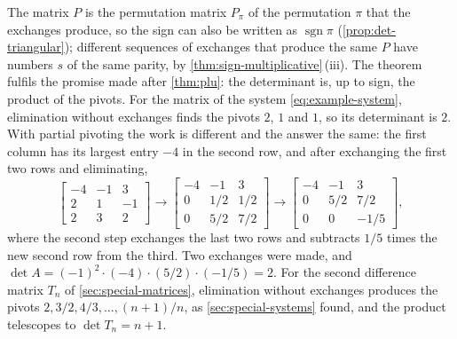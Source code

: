 The matrix $P$ is the permutation matrix $P_\pi$ of the permutation $\pi$ that the exchanges produce, so the sign can also be written as $\operatorname{sgn}\pi$ (\cref{prop:det-triangular}); different sequences of exchanges that produce the same $P$ have numbers $s$ of the same parity, by \cref{thm:sign-multiplicative}\,(iii). The theorem fulfils the promise made after \cref{thm:plu}: the determinant is, up to sign, the product of the pivots. For the matrix of the system \eqref{eq:example-system}, elimination without exchanges finds the pivots $2$, $1$ and $1$, so its determinant is $2$. With partial pivoting the work is different and the answer the same: the first column has its largest entry $-4$ in the second row, and after exchanging the first two rows and eliminating,
\[
\begin{bmatrix}-4&-1&3\\2&1&-1\\2&3&2\end{bmatrix}\longrightarrow\begin{bmatrix}-4&-1&3\\0&1/2&1/2\\0&5/2&7/2\end{bmatrix}\longrightarrow\begin{bmatrix}-4&-1&3\\0&5/2&7/2\\0&0&-1/5\end{bmatrix},
\]
where the second step exchanges the last two rows and subtracts $1/5$ times the new second row from the third. Two exchanges were made, and $\det A=(-1)^2\cdot(-4)\cdot(5/2)\cdot(-1/5)=2$. For the second difference matrix $T_n$ of \cref{sec:special-matrices}, elimination without exchanges produces the pivots $2,3/2,4/3,\ldots,(n+1)/n$, as \cref{sec:special-systems} found, and the product telescopes to $\det T_n=n+1$.

